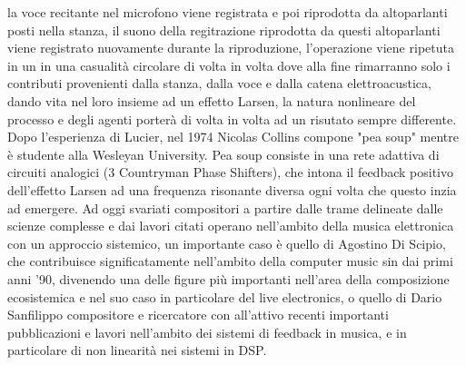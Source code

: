 la voce recitante nel microfono viene registrata e poi riprodotta da altoparlanti
posti nella stanza, il suono della regitrazione riprodotta da questi altoparlanti
viene registrato nuovamente durante la riproduzione, l'operazione
viene ripetuta in un in una casualità circolare di volta in volta dove alla fine rimarranno
solo i contributi provenienti dalla stanza, dalla voce e dalla catena elettroacustica,
dando vita nel loro insieme ad un effetto Larsen, la natura
nonlineare del processo e degli agenti porterà di volta in volta ad un risutato
sempre differente.
Dopo l'esperienza di Lucier, nel 1974 Nicolas Collins compone "pea soup"
mentre è studente alla Wesleyan University.
Pea soup consiste in una rete adattiva di circuiti analogici (3 Countryman Phase Shifters),
che intona il feedback positivo dell'effetto Larsen ad una frequenza risonante diversa
ogni volta che questo inzia ad emergere.
Ad oggi svariati compositori a partire dalle trame delineate dalle scienze complesse e
dai lavori citati operano nell'ambito della musica elettronica con un approccio sistemico,
un importante caso è quello di Agostino Di Scipio, che contribuisce significatamente
nell'ambito della computer music sin dai primi anni '90, divenendo una
delle figure più importanti nell'area della composizione ecosistemica e nel suo
caso in particolare del live electronics, o quello di Dario Sanfilippo
compositore e ricercatore con all'attivo recenti importanti pubblicazioni e lavori
nell'ambito dei sistemi di feedback in musica, e in particolare di non linearità nei sistemi
in DSP.

